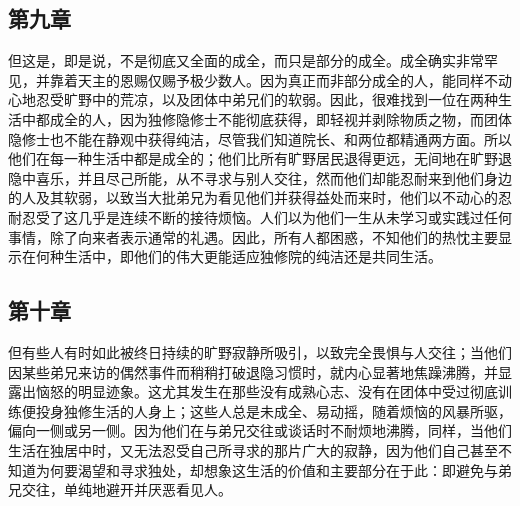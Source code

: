 
\subsection{第九章}

\par

但这是，即是说，不是彻底又全面的成全，而只是部分的成全。成全确实非常罕见，并靠着天主的恩赐仅赐予极少数人。因为真正而非部分成全的人，能同样不动心地忍受旷野中的荒凉，以及团体中弟兄们的软弱。因此，很难找到一位在两种生活中都成全的人，因为独修隐修士不能彻底获得，即轻视并剥除物质之物，而团体隐修士也不能在静观中获得纯洁，尽管我们知道院长、和两位都精通两方面。所以他们在每一种生活中都是成全的；他们比所有旷野居民退得更远，无间地在旷野退隐中喜乐，并且尽己所能，从不寻求与别人交往，然而他们却能忍耐来到他们身边的人及其软弱，以致当大批弟兄为看见他们并获得益处而来时，他们以不动心的忍耐忍受了这几乎是连续不断的接待烦恼。人们以为他们一生从未学习或实践过任何事情，除了向来者表示通常的礼遇。因此，所有人都困惑，不知他们的热忱主要显示在何种生活中，即他们的伟大更能适应独修院的纯洁还是共同生活。\par


\subsection{第十章}

\par

但有些人有时如此被终日持续的旷野寂静所吸引，以致完全畏惧与人交往；当他们因某些弟兄来访的偶然事件而稍稍打破退隐习惯时，就内心显著地焦躁沸腾，并显露出恼怒的明显迹象。这尤其发生在那些没有成熟心志、没有在团体中受过彻底训练便投身独修生活的人身上；这些人总是未成全、易动摇，随着烦恼的风暴所驱，偏向一侧或另一侧。因为他们在与弟兄交往或谈话时不耐烦地沸腾，同样，当他们生活在独居中时，又无法忍受自己所寻求的那片广大的寂静，因为他们自己甚至不知道为何要渴望和寻求独处，却想象这生活的价值和主要部分在于此：即避免与弟兄交往，单纯地避开并厌恶看见人。\par


